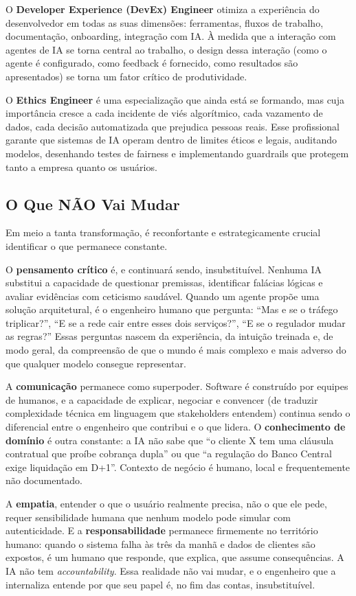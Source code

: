 O \textbf{Developer Experience (DevEx) Engineer} otimiza a experiência do desenvolvedor em todas as suas dimensões: ferramentas, fluxos de trabalho, documentação, onboarding, integração com IA. À medida que a interação com agentes de IA se torna central ao trabalho, o design dessa interação (como o agente é configurado, como feedback é fornecido, como resultados são apresentados) se torna um fator crítico de produtividade.

O \textbf{Ethics Engineer} é uma especialização que ainda está se formando, mas cuja importância cresce a cada incidente de viés algorítmico, cada vazamento de dados, cada decisão automatizada que prejudica pessoas reais. Esse profissional garante que sistemas de IA operam dentro de limites éticos e legais, auditando modelos, desenhando testes de fairness e implementando guardrails que protegem tanto a empresa quanto os usuários.

\subsection{O Que NÃO Vai Mudar}

Em meio a tanta transformação, é reconfortante e estrategicamente crucial identificar o que permanece constante.

O \textbf{pensamento crítico} é, e continuará sendo, insubstituível. Nenhuma IA substitui a capacidade de questionar premissas, identificar falácias lógicas e avaliar evidências com ceticismo saudável. Quando um agente propõe uma solução arquitetural, é o engenheiro humano que pergunta: ``Mas e se o tráfego triplicar?'', ``E se a rede cair entre esses dois serviços?'', ``E se o regulador mudar as regras?'' Essas perguntas nascem da experiência, da intuição treinada e, de modo geral, da compreensão de que o mundo é mais complexo e mais adverso do que qualquer modelo consegue representar.

A \textbf{comunicação} permanece como superpoder. Software é construído por equipes de humanos, e a capacidade de explicar, negociar e convencer (de traduzir complexidade técnica em linguagem que stakeholders entendem) continua sendo o diferencial entre o engenheiro que contribui e o que lidera. O \textbf{conhecimento de domínio} é outra constante: a IA não sabe que ``o cliente X tem uma cláusula contratual que proíbe cobrança dupla'' ou que ``a regulação do Banco Central exige liquidação em D+1''. Contexto de negócio é humano, local e frequentemente não documentado.

A \textbf{empatia}, entender o que o usuário realmente precisa, não o que ele pede, requer sensibilidade humana que nenhum modelo pode simular com autenticidade. E a \textbf{responsabilidade} permanece firmemente no território humano: quando o sistema falha às três da manhã e dados de clientes são expostos, é um humano que responde, que explica, que assume consequências. A IA não tem \textit{accountability}. Essa realidade não vai mudar, e o engenheiro que a internaliza entende por que seu papel é, no fim das contas, insubstituível.

